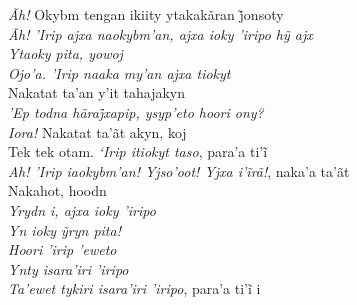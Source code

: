 \bigskip

\begin{linenumbers}\begingroup\raggedright

\noindent   \emph{Ãh!} Okybm tengan ikiity ytakakãran j̃onsoty\\
  \emph{Ãh! ’Irip ajxa naokybm’an, ajxa ioky ’iripo hỹ ajx}\\
  \emph{Ytaoky pita, yowoj}\\
  \emph{Ojo'a. 'Irip naaka my'an ajxa tiokyt}\\
  Nakatat ta'an y'it tahajakyn\\
  \emph{’Ep todna hãraj̃xapip, ysyp’eto hoori ony?}\\
  \emph{Iora!} Nakatat ta'ãt akyn, koj\\
  Tek tek otam. \emph{‘Irip itiokyt taso}, para’a ti’ĩ\\
  \emph{Ah! ’Irip iaokybm’an! Yjso’oot! Yjxa i’ĩrã!}, naka’a ta’ãt\\
  Nakahot, hoodn\\
  \emph{Yrydn i, ajxa ioky 'iripo}\\
  \emph{Yn ioky ỹryn pita!}\\
  \emph{Hoori 'irip 'eweto}\\
  \emph{Ynty isara'iri 'iripo}\\
  \emph{Ta’ewet tykiri isara’iri ’iripo}, para’a ti’ĩ i

\end{linenumbers}\endgroup

